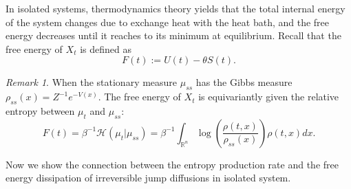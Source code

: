 \documentclass[10pt]{article}
\theoremstyle{definition}
\theoremstyle{remark}
\newtheorem{rem}{Remark}[section]
\numberwithin{equation}{section}
\begin{document}
In isolated systems, thermodynamics theory yields that the total internal energy of the system changes due to exchange heat with the heat bath, and the free energy decreases until it reaches to its minimum at equilibrium.
Recall that the free energy of $X_t$ is defined as 
\begin{equation*}
    F(t) := U(t) - \theta S(t).
\end{equation*}

\begin{rem}
{When the stationary measure $\mu_{ss}$ has the Gibbs measure $\rho_{ss}(x) = Z^{-1}e^{-V(x)}$.
The free energy of $X_t$ is equivariantly given the relative entropy between $\mu_{t}$ and $\mu_{ss}$:
\begin{equation*}
    F(t)=  \beta^{-1}\mathcal{H}(\mu_{t} | \mu_{ss}) = \beta^{-1}\int_{\mathbb{R}^n} \log \left( \frac{\rho(t,x)}{\rho_{ss}(x)} \right)\rho(t,x)dx.
\end{equation*}}
\end{rem}

Now we show the connection between the entropy production rate and the free energy dissipation of irreversible jump diffusions in isolated system. 
\end{document}
